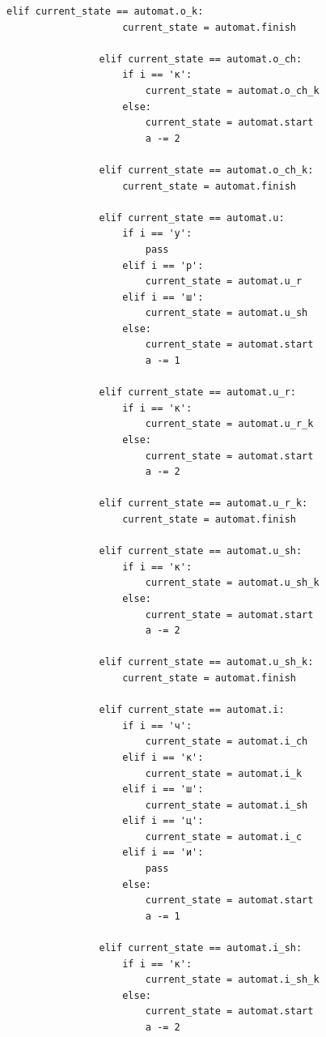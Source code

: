 \documentclass[a4paper,12pt]{report}
\begin{document}
\begin{lstlisting}[frame = single, breaklines, label = list:automat_func, caption = Листинг функций\, работающих с автоматом]
	            elif current_state == automat.o_k:
	                current_state = automat.finish
	
	            elif current_state == automat.o_ch:
	                if i == 'к':
	                    current_state = automat.o_ch_k
	                else:
	                    current_state = automat.start
	                    a -= 2
	
	            elif current_state == automat.o_ch_k:
	                current_state = automat.finish
	
	            elif current_state == automat.u:
	                if i == 'у':
	                    pass
	                elif i == 'р':
	                    current_state = automat.u_r
	                elif i == 'ш':
	                    current_state = automat.u_sh
	                else:
	                    current_state = automat.start
	                    a -= 1
	
	            elif current_state == automat.u_r:
	                if i == 'к':
	                    current_state = automat.u_r_k
	                else:
	                    current_state = automat.start
	                    a -= 2
	
	            elif current_state == automat.u_r_k:
	                current_state = automat.finish
	
	            elif current_state == automat.u_sh:
	                if i == 'к':
	                    current_state = automat.u_sh_k
	                else:
	                    current_state = automat.start
	                    a -= 2
	
	            elif current_state == automat.u_sh_k:
	                current_state = automat.finish
	
	            elif current_state == automat.i:
	                if i == 'ч':
	                    current_state = automat.i_ch
	                elif i == 'к':
	                    current_state = automat.i_k
	                elif i == 'ш':
	                    current_state = automat.i_sh
	                elif i == 'ц':
	                    current_state = automat.i_c
	                elif i == 'и':
	                    pass
	                else:
	                    current_state = automat.start
	                    a -= 1
	
	            elif current_state == automat.i_sh:
	                if i == 'к':
	                    current_state = automat.i_sh_k
	                else:
	                    current_state = automat.start
	                    a -= 2
	

\end{lstlisting}
\end{document}
